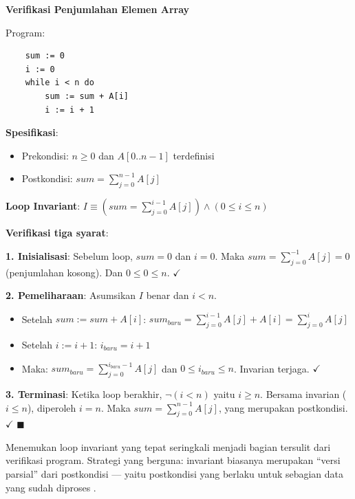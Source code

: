 \begin{contoh}
\textbf{Verifikasi Penjumlahan Elemen Array}

Program:
\begin{verbatim}
    sum := 0
    i := 0
    while i < n do
        sum := sum + A[i]
        i := i + 1
\end{verbatim}

\textbf{Spesifikasi}:
\begin{itemize}
    \item Prekondisi: $n \geq 0$ dan $A[0..n-1]$ terdefinisi
    \item Postkondisi: $sum = \sum_{j=0}^{n-1} A[j]$
\end{itemize}

\textbf{Loop Invariant}: $I \equiv \left(sum = \sum_{j=0}^{i-1} A[j]\right) \wedge (0 \leq i \leq n)$

\textbf{Verifikasi tiga syarat}:

\textbf{1. Inisialisasi}: Sebelum loop, $sum = 0$ dan $i = 0$. Maka $sum = \sum_{j=0}^{-1} A[j] = 0$ (penjumlahan kosong). Dan $0 \leq 0 \leq n$. $\checkmark$

\textbf{2. Pemeliharaan}: Asumsikan $I$ benar dan $i < n$.
\begin{itemize}
    \item Setelah $sum := sum + A[i]$: $sum_{baru} = \sum_{j=0}^{i-1} A[j] + A[i] = \sum_{j=0}^{i} A[j]$
    \item Setelah $i := i + 1$: $i_{baru} = i + 1$
    \item Maka: $sum_{baru} = \sum_{j=0}^{i_{baru}-1} A[j]$ dan $0 \leq i_{baru} \leq n$. Invarian terjaga. $\checkmark$
\end{itemize}

\textbf{3. Terminasi}: Ketika loop berakhir, $\neg(i < n)$ yaitu $i \geq n$. Bersama invarian ($i \leq n$), diperoleh $i = n$. Maka $sum = \sum_{j=0}^{n-1} A[j]$, yang merupakan postkondisi. $\checkmark$ $\blacksquare$
\end{contoh}

\begin{catatan}
Menemukan loop invariant yang tepat seringkali menjadi bagian tersulit dari verifikasi program. Strategi yang berguna: invariant biasanya merupakan ``versi parsial'' dari postkondisi --- yaitu postkondisi yang berlaku untuk sebagian data yang sudah diproses \cite{wiki_loop_invariant}.
\end{catatan}

